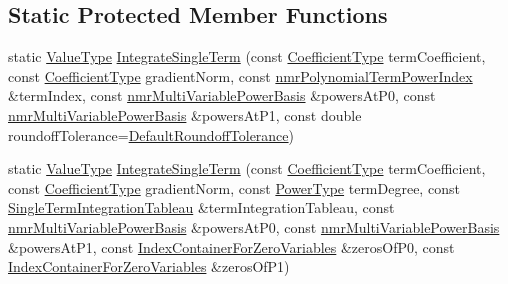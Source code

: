 \subsection*{Static Protected Member Functions}
\begin{DoxyCompactItemize}
\item 
static \hyperlink{classnmr_bernstein_polynomial_line_integral_ab1d3f80540e0791f359e53b3ef074a86}{Value\+Type} \hyperlink{classnmr_bernstein_polynomial_line_integral_a7adbcbff96185a3c803f8e0afae7c263}{Integrate\+Single\+Term} (const \hyperlink{classnmr_bernstein_polynomial_line_integral_a0dc7480d6f60af6d3d8da6e32444edf7}{Coefficient\+Type} term\+Coefficient, const \hyperlink{classnmr_bernstein_polynomial_line_integral_a0dc7480d6f60af6d3d8da6e32444edf7}{Coefficient\+Type} gradient\+Norm, const \hyperlink{classnmr_polynomial_term_power_index}{nmr\+Polynomial\+Term\+Power\+Index} \&term\+Index, const \hyperlink{classnmr_multi_variable_power_basis}{nmr\+Multi\+Variable\+Power\+Basis} \&powers\+At\+P0, const \hyperlink{classnmr_multi_variable_power_basis}{nmr\+Multi\+Variable\+Power\+Basis} \&powers\+At\+P1, const double roundoff\+Tolerance=\hyperlink{classnmr_bernstein_polynomial_line_integral_acd99dd062ecb011d518908d73b5f6c80}{Default\+Roundoff\+Tolerance})
\item 
static \hyperlink{classnmr_bernstein_polynomial_line_integral_ab1d3f80540e0791f359e53b3ef074a86}{Value\+Type} \hyperlink{classnmr_bernstein_polynomial_line_integral_af8a264777d4cea8caef1f09a15ccae1c}{Integrate\+Single\+Term} (const \hyperlink{classnmr_bernstein_polynomial_line_integral_a0dc7480d6f60af6d3d8da6e32444edf7}{Coefficient\+Type} term\+Coefficient, const \hyperlink{classnmr_bernstein_polynomial_line_integral_a0dc7480d6f60af6d3d8da6e32444edf7}{Coefficient\+Type} gradient\+Norm, const \hyperlink{classnmr_bernstein_polynomial_line_integral_a0e07aee2cb7c5f3f5d2c1f95cd4e9abf}{Power\+Type} term\+Degree, const \hyperlink{classnmr_bernstein_polynomial_line_integral_a1d31908eb8195d1c00427f12dee7fe6b}{Single\+Term\+Integration\+Tableau} \&term\+Integration\+Tableau, const \hyperlink{classnmr_multi_variable_power_basis}{nmr\+Multi\+Variable\+Power\+Basis} \&powers\+At\+P0, const \hyperlink{classnmr_multi_variable_power_basis}{nmr\+Multi\+Variable\+Power\+Basis} \&powers\+At\+P1, const \hyperlink{classnmr_bernstein_polynomial_line_integral_ad240bb2714fe8f3ce33ba2fa696931f8}{Index\+Container\+For\+Zero\+Variables} \&zeros\+Of\+P0, const \hyperlink{classnmr_bernstein_polynomial_line_integral_ad240bb2714fe8f3ce33ba2fa696931f8}{Index\+Container\+For\+Zero\+Variables} \&zeros\+Of\+P1)

\end{DoxyCompactItemize}
